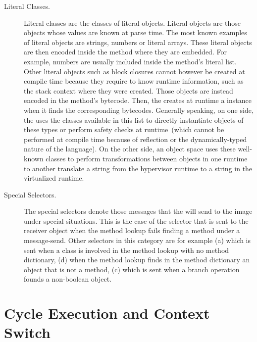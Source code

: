 \begin{description}
\item[Literal Classes.] Literal classes are the classes of literal objects. Literal objects are those objects whose values are known at parse time. The most known examples of literal objects are strings, numbers or literal arrays. These literal objects are then encoded inside the method where they are embedded. For example, numbers are usually included inside the method's literal list. Other literal objects such as block closures cannot however be created at compile time because they require to know runtime information, such as the stack context where they were created. Those objects are instead encoded in the method's bytecode. Then, the \VM creates at runtime a  instance when it finds the corresponding bytecodes. Generally speaking, on one side, the \VM uses the classes available in this list to directly instantiate objects of these types or perform safety checks at runtime~(which cannot be performed at compile time because of reflection or the dynamically-typed nature of the language). On the other side, an object space uses these well-known classes to perform transformations between objects in one runtime to another \eg translate a string from the hypervisor runtime to a string in the virtualized runtime.

\item[Special Selectors.] The special selectors denote those messages that the \VM will send to the image under special situations. This is the case of the  selector that is sent to the receiver object when the method lookup fails finding a method under a message-send. Other selectors in this category are for example (a)  which is sent when a class is involved in the method lookup with no method dictionary, (d)  when the method lookup finds in the method dictionary an object that is not a method, (c)  which is sent when a branch operation founds a non-boolean object.

\end{description}




\section{Cycle Execution and Context Switch} \label{sec:context_switch}

